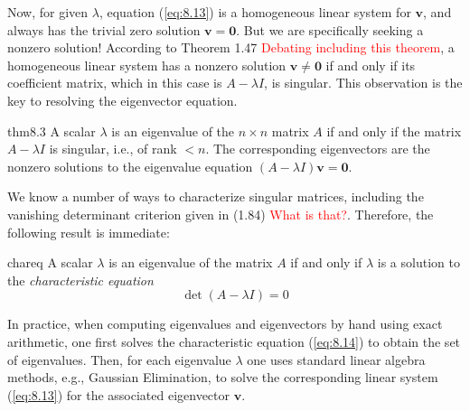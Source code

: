 \documentclass[12pt]{article}
\theoremstyle{remark}
\begin{document}
Now, for given $\lambda$, equation (\ref{eq:8.13}) is a homogeneous linear system for $\mathbf{v}$, and always has the trivial zero solution $\mathbf{v}=\mathbf{0}$. But we are specifically seeking a nonzero solution! According to Theorem 1.47 \textcolor{red}{Debating including this theorem}, a homogeneous linear system has a nonzero solution $\mathbf{v}\neq \mathbf{0}$ if and only if its coefficient matrix, which in this case is $A-\lambda I$, is singular. This observation is the key to resolving the eigenvector equation.
\begin{thm}{}{thm8.3}
    A scalar $\lambda$ is an eigenvalue of the $n\times n$ matrix $A$ if and only if the matrix $A-\lambda I$ is singular, i.e., of rank $<n$. The corresponding eigenvectors are the nonzero solutions to the eigenvalue equation $(A-\lambda I)\mathbf{v}=\mathbf{0}$.
\end{thm}
We know a number of ways to characterize singular matrices, including the vanishing determinant criterion given in (1.84) \textcolor{red}{What is that?}. Therefore, the following result is immediate:
\begin{cor}{}{chareq}
    A scalar $\lambda$ is an eigenvalue of the matrix $A$ if and only if $\lambda$ is a solution to the \emph{characteristic equation}
    \begin{equation}
        \det (A-\lambda I) = 0
        \label{eq:8.14}
    \end{equation}
\end{cor}

In practice, when computing eigenvalues and eigenvectors by hand using exact arithmetic, one first solves the characteristic equation (\ref{eq:8.14}) to obtain the set of eigenvalues. Then, for each eigenvalue $\lambda$ one uses standard linear algebra methods, e.g., Gaussian Elimination, to solve the corresponding linear system (\ref{eq:8.13}) for the associated eigenvector $\mathbf{v}$.
\end{document}
